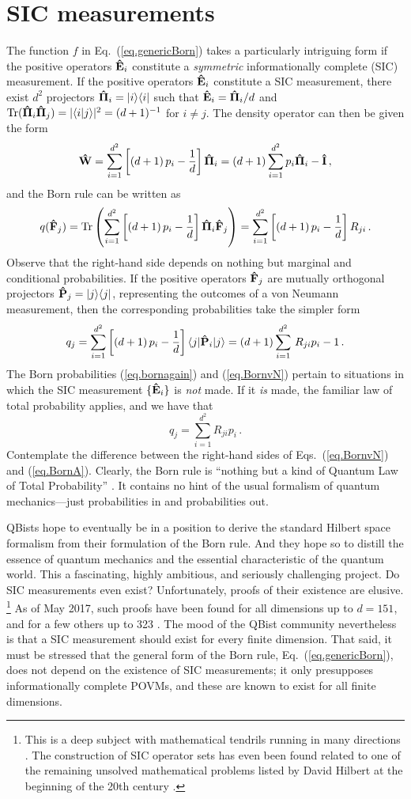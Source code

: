 \documentclass[12pt]{article}
\newcommand{\braket}[2]{\langle#1|#2\rangle}
\newcommand{\be}{\begin{equation}}
\newcommand{\ee}{\end{equation}}
\newcommand{\hE}{{\bf\hat E}}
\newcommand{\hF}{{\bf\hat F}}
\newcommand{\hP}{{\bf\hat P}}
\newcommand{\hW}{{\bf\hat W}}
\newcommand{\hPi}{{\bf\hat\Pi}}
\newcommand{\hI}{{\bf\hat I}}
\newcommand{\ketbra}[2]{\vert#1\rangle\langle#2\vert}
\newcommand{\sandwich}[3]{\langle#1\vert#2\vert#3\rangle}
\begin{document}
\section{SIC measurements}\label{sec.sic}
The function $f$ in Eq.~(\ref{eq.genericBorn}) takes a particularly intriguing form if the positive operators $\hE_i$ constitute a \emph{symmetric} informationally complete (SIC) measurement. If the positive operators $\hE_i$ constitute a SIC measurement, there exist $d^2$ projectors $\hPi_i=\ketbra ii$ such that $\hE_i=\hPi_i/d$ and $\hbox{Tr}(\hPi_i\hPi_j)=|\braket ij|^2=(d+1)^{-1}$ for $i\neq j$. The density operator can then be given the form \cite{Fuchs_Perimeter,Fuchs2004}
\be
\hW=\sum_{i=1}^{d^2}\left[(d+1)\,p_i-\frac1d\right]\hPi_i=
(d+1)\sum_{i=1}^{d^2}p_i\hPi_i-\hI\,,
\label{eq.bado}
\ee
and the Born rule can be written as
\be
q(\hF_j)=\hbox{Tr}\left(\sum_{i=1}^{d^2}
\left[(d+1)\,p_i-\frac1d\right]\hPi_i\hF_j\right)
=\sum_{i=1}^{d^2}\left[(d+1)\,p_i-\frac1d\right]R_{ji}\,.
\label{eq.bornagain}
\ee
Observe that the right-hand side depends on nothing but marginal and
conditional probabilities. If the positive operators $\hF_j$ are mutually orthogonal projectors $\hP_j=\ketbra jj$, representing the outcomes of a von Neumann measurement, then the corresponding probabilities take the simpler form
\be
q_j=\sum_{i=1}^{d^2}
\left[(d+1)\,p_i-\frac1d\right]\sandwich j{\hP_i}j
=(d+1)\sum_{i=1}^{d^2}\,R_{ji}p_i-1\,.
\label{eq.BornvN}
\ee
The Born probabilities (\ref{eq.bornagain}) and (\ref{eq.BornvN}) pertain to situations in which the SIC measurement $\{\hE_i\}$ is \emph{not} made. If it \emph{is} made, the familiar law of total probability applies, and we have that
\be
q_j=\sum_{i=1}^{d^2}R_{ji}p_i \,.
\label{eq.BornA}
\ee
Contemplate the difference between the right-hand sides of Eqs.~(\ref{eq.BornvN}) and (\ref{eq.BornA}). Clearly, the Born rule is ``nothing but a kind of Quantum Law of Total Probability'' \cite{Fuchs_Perimeter}. It contains no hint of the usual formalism of quantum mechanics---just probabilities in and probabilities out.

QBists hope to eventually be in a position to derive the standard Hilbert space formalism from their formulation of the Born rule. And they hope so to distill the essence of quantum mechanics and the essential characteristic of the quantum world. This a fascinating, highly ambitious, and  seriously challenging project. Do SIC measurements even exist? Unfortunately, proofs of their existence are elusive.%
\footnote{This is a deep subject with mathematical tendrils running in many directions \cite{Applebyetal2015}. The construction of SIC operator sets has even been found related to one of the remaining unsolved mathematical problems listed by David Hilbert at the beginning  of the 20th century \cite{Applebyetal2017}.}
As of May 2017, such proofs have been found for all dimensions up to $d{=}151$, and for a few others up to 323 \cite{Fuchs_Notwithstanding}. The mood of the QBist community nevertheless is that a SIC measurement should exist for every finite dimension. That said, it must be stressed that the general form of the Born rule, Eq.~(\ref{eq.genericBorn}), does not depend on the existence of SIC measurements; it only presupposes informationally complete POVMs, and these are known to exist for all finite dimensions.
\end{document}
